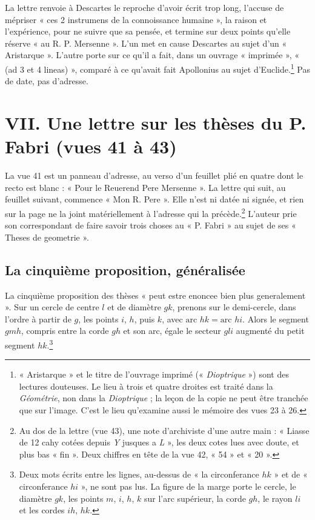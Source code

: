 \documentclass[11pt,a4paper]{article}
\begin{document}
La lettre renvoie à Descartes le reproche d'avoir écrit trop long, l'accuse de
mépriser « ces 2 instrumens de la connoissance humaine », la raison et
l'expérience, pour ne suivre que sa pensée, et termine sur deux points qu'elle
réserve « au R. P. Mersenne ». L'un met en cause Descartes au sujet d'un
« Aristarque ». L'autre porte sur ce qu'il a fait, dans un ouvrage « imprimée »,
« (ad 3 et 4 lineas) », comparé à ce qu'avait fait Apollonius au sujet
d'Euclide.\footnote{« Aristarque » et le titre de l'ouvrage imprimé
(« \emph{Dioptrique} ») sont des lectures douteuses. Le lieu à trois et quatre
droites est traité dans la \emph{Géométrie}, non dans la \emph{Dioptrique} ; la
leçon de la copie ne peut être tranchée que sur l'image. C'est le lieu
qu'examine aussi le mémoire des vues 23 à 26.} Pas de date, pas d'adresse.

\section*{VII. Une lettre sur les thèses du P. Fabri (vues 41 à 43)}

La vue 41 est un panneau d'adresse, au verso d'un feuillet plié en quatre
dont le recto est blanc : « Pour le Reuerend Pere Mersenne ». La lettre qui
suit, au feuillet suivant, commence « Mon R. Pere ». Elle n'est ni datée ni
signée, et rien sur la page ne la joint matériellement à l'adresse qui la
précède.\footnote{Au dos de la lettre (vue 43), une note d'archiviste d'une
autre main : « Liasse de 12 cahy cotées depuis \emph{Y} jusques a \emph{L} »,
les deux cotes lues avec doute, et plus bas « fin ». Deux chiffres en tête de
la vue 42, « 54 » et « 20 ».} L'auteur prie son correspondant de faire savoir
trois choses au « P. Fabri » au sujet de ses « Theses de geometrie ».

\subsection*{La cinquième proposition, généralisée}

La cinquième proposition des thèses « peut estre enoncee bien plus
generalement ». Sur un cercle de centre \(l\) et de diamètre \(gk\), prenons sur
le demi-cercle, dans l'ordre à partir de \(g\), les points \(i\), \(h\), puis
\(k\), avec
\(\text{arc }hk=\text{arc }hi\). Alors le segment \(gmh\), compris entre la
corde \(gh\) et son arc, égale le secteur \(gli\) augmenté du petit segment
\(hk\).\footnote{Deux mots écrits entre les lignes, au-dessus de « la
circonferance \(hk\) » et de « circonferance \(hi\) », ne sont pas lus. La
figure de la marge porte le cercle, le diamètre \(gk\), les points \(m\),
\(i\), \(h\), \(k\) sur l'arc supérieur, la corde \(gh\), le rayon \(li\) et les
cordes \(ih\), \(hk\).}
\end{document}

